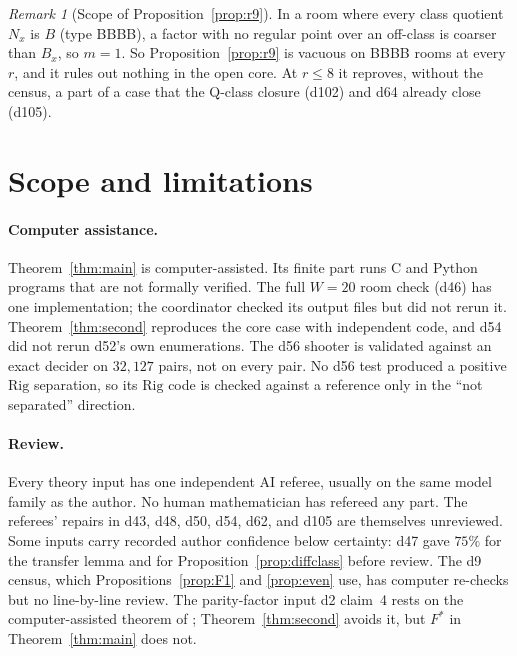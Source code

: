 \documentclass[11pt]{article}
\theoremstyle{definition}
\theoremstyle{remark}
\newtheorem{remark}{Remark}
\newcommand{\Rig}{\mathrm{Rig}}
\begin{document}
\begin{remark}[Scope of Proposition~\ref{prop:r9}]
In a room where every class quotient $N_x$ is $B$ (type BBBB), a factor with
no regular point over an off-class is coarser than $B_x$, so $m=1$. So
Proposition~\ref{prop:r9} is vacuous on BBBB rooms at every $r$, and it rules
out nothing in the open core. At $r\le 8$ it reproves, without the census, a
part of a case that the Q-class closure (d102) and d64 already close (d105).
\end{remark}

\section{Scope and limitations}\label{sec:limits}

\paragraph{Computer assistance.}
Theorem~\ref{thm:main} is computer-assisted. Its finite part runs C and Python
programs that are not formally verified. The full $W=20$ room check (d46) has
one implementation; the coordinator checked its output files but did not rerun
it. Theorem~\ref{thm:second} reproduces the core case with independent code,
and d54 did not rerun d52's own enumerations. The d56 shooter is validated
against an exact decider on $32{,}127$ pairs, not on every pair. No d56 test
produced a positive $\Rig$ separation, so its $\Rig$ code is checked against a
reference only in the ``not separated'' direction.

\paragraph{Review.}
Every theory input has one independent AI referee, usually on the same model
family as the author. No human mathematician has refereed any part. The
referees' repairs in d43, d48, d50, d54, d62, and d105 are themselves
unreviewed. Some inputs carry recorded author confidence below certainty: d47
gave $75\%$ for the transfer lemma and for Proposition~\ref{prop:diffclass}
before review. The d9 census, which Propositions~\ref{prop:F1} and
\ref{prop:even} use, has computer re-checks but no line-by-line review. The
parity-factor input d2 claim~4 rests on the computer-assisted theorem of
\cite{K6}; Theorem~\ref{thm:second} avoids it, but $F^*$ in
Theorem~\ref{thm:main} does not.
\end{document}

